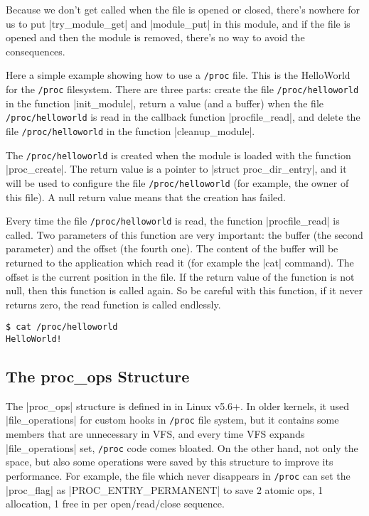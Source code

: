 \documentclass[10pt, oneside]{book}
\begin{document}
Because we don't get called when the file is opened or closed, there's nowhere for us to put \cpp|try_module_get| and \cpp|module_put| in this module, and if the file is opened and then the module is removed, there's no way to avoid the consequences.

Here a simple example showing how to use a \verb|/proc| file.
This is the HelloWorld for the \verb|/proc| filesystem.
There are three parts: create the file \verb|/proc/helloworld| in the function \cpp|init_module|, return a value (and a buffer) when the file \verb|/proc/helloworld| is read in the callback function \cpp|procfile_read|, and delete the file \verb|/proc/helloworld| in the function \cpp|cleanup_module|.

The \verb|/proc/helloworld| is created when the module is loaded with the function \cpp|proc_create|.
The return value is a pointer to \cpp|struct proc_dir_entry|, and it will be used to configure the file \verb|/proc/helloworld| (for example, the owner of this file).
A null return value means that the creation has failed.

Every time the file \verb|/proc/helloworld| is read, the function \cpp|procfile_read| is called.
Two parameters of this function are very important: the buffer (the second parameter) and the offset (the fourth one).
The content of the buffer will be returned to the application which read it (for example the \sh|cat| command).
The offset is the current position in the file.
If the return value of the function is not null, then this function is called again.
So be careful with this function, if it never returns zero, the read function is called endlessly.

\begin{verbatim}
$ cat /proc/helloworld
HelloWorld!
\end{verbatim}


\subsection{The proc\_ops Structure}
\label{sec:proc_ops}
The \cpp|proc_ops| structure is defined in  in Linux v5.6+.
In older kernels, it used \cpp|file_operations| for custom hooks in \verb|/proc| file system, but it contains some members that are unnecessary in VFS, and every time VFS expands \cpp|file_operations| set, \verb|/proc| code comes bloated.
On the other hand, not only the space, but also some operations were saved by this structure to improve its performance.
For example, the file which never disappears in \verb|/proc| can set the \cpp|proc_flag| as \cpp|PROC_ENTRY_PERMANENT| to save 2 atomic ops, 1 allocation, 1 free in per open/read/close sequence.
\end{document}
